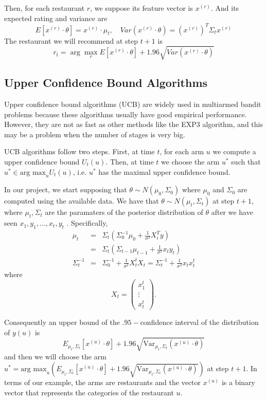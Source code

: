 \documentclass{article}
\theoremstyle{plain}
\theoremstyle{definition}
\begin{document}
Then, for each restaurant $r$, we suppose its feature vector is ${x}^{(r)}$. And its expected rating and variance are
\[E[{x}^{(r)}\cdot \theta] = {x}^{(r)}\cdot \mu_t,\quad Var({x}^{(r)}\cdot \theta) =({x}^{(r)})^T\Sigma_t {x}^{(r)} \]
The restaurant we will recommend at step $t+1$ is
\[r_t = \arg\max_r E[{x}^{(r)}\cdot \theta] + 1.96 \sqrt{Var({x}^{(r)}\cdot \theta)}\]

\subsection{Upper Confidence Bound Algorithms}

Upper confidence bound algorithms (UCB) are widely used in multiarmed
bandit problems because these algorithms usually have good empirical performance. 
However, they are not as fast as other methods like the EXP3 algorithm, and this may be a problem
when the number of stages is very big.

UCB algorithms follow two steps. First, at time $t$, for each arm
$u$ we compute a upper confidence bound $U_{t}\left(u\right)$. Then,
at time $t$ we choose the arm $u^{*}$ such that $u^{*}\in\mbox{arg max}_{u}U_{t}\left(u\right)$,
i.e. $u^{*}$ has the maximal upper confidence bound. 

In our project, we start supposing that $\theta\sim N\left(\mu_{0},\Sigma_{0}\right)$
where $\mu_{0}$ and $\Sigma_{0}$ are computed using the available
data. We have that $\theta\sim N\left(\mu_{t},\Sigma_{t}\right)$
at step $t+1$, where $\mu_{t},\Sigma_{t}$ are the paramaters of
the posterior distribution of $\theta$ after we have seen $x_{1},y_{1},\ldots,x_{t},y_{t}$
. Specifically,
\begin{eqnarray*}
\mu_{t} & = & \Sigma_{t}\left(\Sigma_{0}^{-1}\mu_{0}+\frac{1}{\sigma^{2}}X_{i}^{T}y\right)\\
 & = & \Sigma_{t}\left(\Sigma_{t-1}\mu_{t-1}+\frac{1}{\sigma^{2}}x_{t}y_{t}\right)\\
\Sigma_{t}^{-1} & = & \Sigma_{0}^{-1}+\frac{1}{\sigma^{2}}X_{t}^{t}X_{t}=\Sigma_{t}^{-1}+\frac{1}{\sigma^{2}}x_{t}x_{t}^{t}
\end{eqnarray*}
where 
\[
X_{t}=\left(\begin{array}{c}
x_{1}^{t}\\
\vdots\\
x_{t}^{t}
\end{array}\right).
\]


Consequently an upper bound of the $.95-$confidence interval of the distribution
of $y\left(u\right)$ is 
\[
E_{\mu_{t},\Sigma_{t}}\left[x^{\left(u\right)}\cdot\theta\right]+1.96\sqrt{\mbox{Var}_{\mu_{t},\Sigma_{t}}\left(x^{\left(u\right)}\cdot\theta\right)}
\]
and then we will choose the arm $u^{*}=\mbox{arg max}_{u}\left(E_{\mu_{t},\Sigma_{t}}\left[x^{\left(u\right)}\cdot\theta\right]+1.96\sqrt{\mbox{Var}_{\mu_{t},\Sigma_{t}}\left(x^{\left(u\right)}\cdot\theta\right)}\right)$
at step $t+1$. In terms of our example, the arms are restaurants
and the vector $x^{\left(u\right)}$ is a binary vector that represents
the categories of the restaurant $u$.
\end{document}

